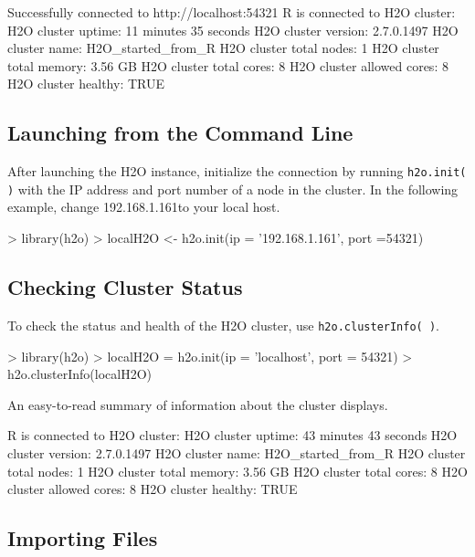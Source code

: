 \documentclass[11pt]{article}
\begin{document}
\begin{enumerate}
\begin{spverbatim}
Successfully connected to http://localhost:54321
       R is connected to H2O cluster:
   H2O cluster uptime:         11 minutes 35 seconds
   H2O cluster version:        2.7.0.1497
   H2O cluster name:           H2O_started_from_R
   H2O cluster total nodes:    1
   H2O cluster total memory:   3.56 GB
   H2O cluster total cores:    8
   H2O cluster allowed cores:  8
   H2O cluster healthy:        TRUE
\end{spverbatim}


\subsection{Launching from the Command Line}

After launching the H2O instance, initialize the connection by running {\texttt{h2o.init( )}} with the IP address and port number of a node in the cluster. In the following example, change 192.168.1.161to your local host. 
\begin{spverbatim}
> library(h2o)
> localH2O <- h2o.init(ip = '192.168.1.161', port =54321)
\end{spverbatim}

\subsection{Checking Cluster Status}


To check the status and health of the H2O cluster, use {\texttt{h2o.clusterInfo( )}}.
\begin{spverbatim}

> library(h2o)
> localH2O = h2o.init(ip = 'localhost', port = 54321)
> h2o.clusterInfo(localH2O)
\end{spverbatim}

An easy-to-read summary of information about the cluster displays. 
\begin{spverbatim}

R is connected to H2O cluster:
  H2O cluster uptime:         43 minutes 43 seconds
  H2O cluster version:        2.7.0.1497
  H2O cluster name:           H2O_started_from_R
  H2O cluster total nodes:    1
  H2O cluster total memory:   3.56 GB
  H2O cluster total cores:    8
  H2O cluster allowed cores:  8
  H2O cluster healthy:        TRUE
\end{spverbatim}

\subsection{Importing Files}


\end{enumerate}
\end{document}
